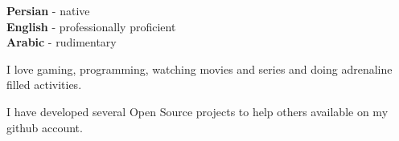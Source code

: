 \documentclass[9pt]{developercv} %
\begin{document}

\begin{minipage}[t]{0.3\textwidth}
	\vspace{-\baselineskip} %

	
	\textbf{Persian} - native\\
	\textbf{English} - professionally proficient\\
	\textbf{Arabic}  - rudimentary
\end{minipage}
\hfill
\begin{minipage}[t]{0.3\textwidth}
	\vspace{-\baselineskip} %
	
	
	I love gaming, programming, watching movies and series and doing adrenaline filled activities.
\end{minipage}
\hfill
\begin{minipage}[t]{0.3\textwidth}
	\vspace{-\baselineskip} %
	
	
	I have developed several Open Source projects to help others available on my github account.
\end{minipage}

\end{document}
